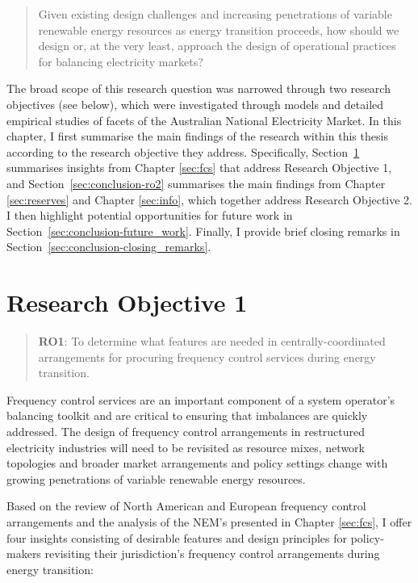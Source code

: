 \documentclass[12pt,a4paper,]{report}
\begin{document}
\begin{quote}
Given existing design challenges and increasing penetrations of variable
renewable energy resources as energy transition proceeds, how should we
design or, at the very least, approach the design of operational
practices for balancing electricity markets?
\end{quote}

The broad scope of this research question was narrowed through two
research objectives (see below), which were investigated through models
and detailed empirical studies of facets of the Australian National
Electricity Market. In this chapter, I first summarise the main findings
of the research within this thesis according to the research objective
they address. Specifically, Section~\ref{sec:conclusion-ro1} summarises
insights from Chapter \ref{sec:fcs} that address Research Objective 1,
and Section~\ref{sec:conclusion-ro2} summarises the main findings from
Chapter \ref{sec:reserves} and Chapter \ref{sec:info}, which together
address Research Objective 2. I then highlight potential opportunities
for future work in Section~\ref{sec:conclusion-future_work}. Finally, I
provide brief closing remarks in
Section~\ref{sec:conclusion-closing_remarks}.

\hypertarget{sec:conclusion-ro1}{%
\section{Research Objective 1}\label{sec:conclusion-ro1}}

\begin{quote}
\textbf{RO1}: To determine what features are needed in
centrally-coordinated arrangements for procuring frequency control
services during energy transition.
\end{quote}

Frequency control services are an important component of a system
operator's balancing toolkit and are critical to ensuring that
imbalances are quickly addressed. The design of frequency control
arrangements in restructured electricity industries will need to be
revisited as resource mixes, network topologies and broader market
arrangements and policy settings change with growing penetrations of
variable renewable energy resources.

Based on the review of North American and European frequency control
arrangements and the analysis of the NEM's presented in Chapter
\ref{sec:fcs}, I offer four insights consisting of desirable features
and design principles for policy-makers revisiting their jurisdiction's
frequency control arrangements during energy transition:
\end{document}
